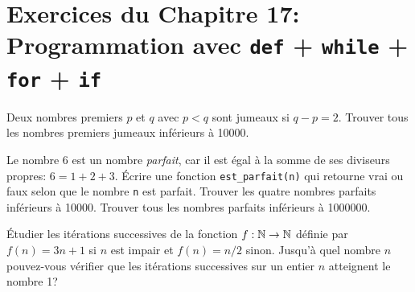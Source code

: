 \section*{Exercices du Chapitre 17: Programmation avec \texttt{def} + \texttt{while} +
\texttt{for} + \texttt{if}}

\begin{question}
Deux nombres premiers $p$ et $q$ avec $p<q$ sont jumeaux si $q-p=2$. Trouver
tous les nombres premiers jumeaux inférieurs à 10000.
\end{question}

\begin{question}
Le nombre 6 est un nombre \emph{parfait}, car il est égal à la somme de ses
diviseurs propres: $6=1+2+3$. Écrire une fonction \texttt{est\_parfait(n)} qui
retourne vrai ou faux selon que le nombre \texttt{n} est parfait.
Trouver les quatre nombres parfaits inférieurs à 10000. Trouver tous les nombres
parfaits inférieurs à 1000000.
\end{question}




\begin{question}
Étudier les itérations successives de la fonction $f : \mathbb{N} \rightarrow \mathbb{N}$ définie par
$f(n) = 3n+1$ si $n$ est impair
et $f(n) = n/2$ sinon.
Jusqu'à quel nombre $n$ pouvez-vous vérifier que les itérations successives
sur un entier $n$ atteignent le nombre 1?
\end{question}



